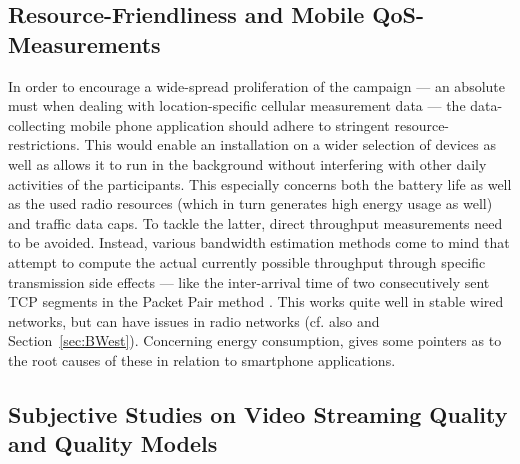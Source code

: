 \subsection{Resource-Friendliness and Mobile QoS-Measurements}

In order to encourage a wide-spread proliferation of the campaign --- an absolute must when dealing with location-specific cellular measurement data --- the data-collecting mobile phone application should adhere to stringent resource-restrictions. This would enable an installation on a wider selection of devices as well as allows it to run in the background without interfering with other daily activities of the participants. This especially concerns both the battery life as well as the used radio resources (which in turn generates high energy usage as well) and traffic data caps. To tackle the latter, direct throughput measurements need to be avoided. Instead, various bandwidth estimation methods come to mind that attempt to compute the actual currently possible throughput through specific transmission side effects --- like the inter-arrival time of two consecutively sent \acrshort{TCP} segments in the Packet Pair method \cite{Lai01nettimer:a,Ribeiro:2004:SAB:1005686.1005734,Strauss:2003:MSA:948205.948211}. This works quite well in stable wired networks, but can have issues in radio networks (cf. also \cite{6918916} and Section~\ref{sec:BWest}). Concerning energy consumption, \cite{schwartz13angryapps,6664206} gives some pointers as to the root causes of these in relation to smartphone applications.


\subsection{Subjective Studies on Video Streaming Quality and Quality Models}

